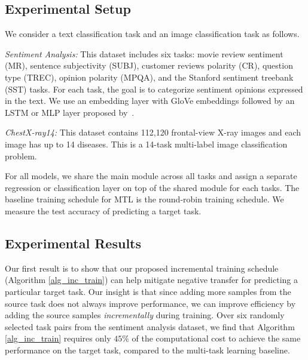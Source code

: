 \subsection{Experimental Setup}

We consider a text classification task and an image classification task as follows.

{\it Sentiment Analysis:} This dataset includes six tasks: movie review sentiment (MR), sentence subjectivity (SUBJ), customer reviews polarity (CR), question type (TREC), opinion polarity (MPQA), and the Stanford sentiment treebank (SST) tasks.
{For each task, the goal is to categorize sentiment opinions expressed in the text.
We use an embedding layer with GloVe embeddings
followed by an LSTM or MLP layer proposed by~\cite{lei2018simple}.
}

{\it ChestX-ray14:} This dataset contains 112,120 frontal-view X-ray images and each image has up to 14 diseases.
This is a 14-task multi-label image classification problem.


For all models, we share the main module across all tasks and assign a separate regression or classification layer on top of the shared module for each tasks.
The baseline training schedule for MTL is the round-robin training schedule.
We measure the test accuracy of predicting a target task.


\subsection{Experimental Results}

Our first result is to show that our proposed incremental training schedule (Algorithm \ref{alg_inc_train}) can help mitigate negative transfer for predicting a particular target task.
Our insight is that since adding more samples from the source task does not always improve performance, we can improve efficiency by adding the source samples \textit{incrementally} during training.
Over six randomly selected task pairs from the sentiment analysis dataset, we find that Algorithm \ref{alg_inc_train} requires only $45\%$ of the computational cost to achieve the same performance on the target task, compared to the multi-task learning baseline.


